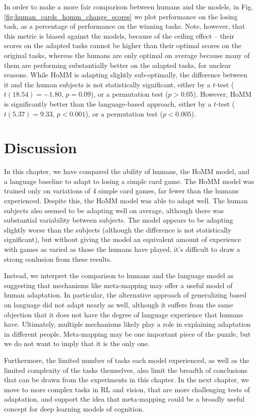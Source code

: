 In order to make a more fair comparison between humans and the models, in Fig. \ref{fig:human_cards_homm_change_scores} we plot performance on the losing task, as a percentage of performance on the winning tasks. Note, however, that this metric is biased against the models, because of the ceiling effect -- their scores on the adapted tasks cannot be higher than their optimal scores on the original tasks, whereas the humans are only optimal on average because many of them are performing substantially better on the adapted tasks, for unclear reasons. While HoMM is adapting slightly sub-optimally, the difference between it and the human subjects is not statistically significant, either by a \(t\)-test (\(t(18.54) = -1.80\), \(p = 0.09\)), or a permutation test (\(p > 0.05\)). However, HoMM is significantly better than the language-based approach, either by a   \(t\)-test (\(t(5.37) = 9.33\), \(p < 0.001\)), or a permutation test (\(p < 0.005\)). \par

\section{Discussion}

In this chapter, we have compared the ability of humans, the HoMM model, and a language baseline to adapt to losing a simple card game. The HoMM model was trained only on variations of 4 simple card games, far fewer than the humans experienced. Despite this, the HoMM model was able to adapt well. The human subjects also seemed to be adapting well on average, although there was substantial variability between subjects. The model appears to be adapting slightly worse than the subjects (although the difference is not statistically significant), but without giving the model an equivalent amount of experience with games as varied as those the humans have played, it's difficult to draw a strong conlusion from these results. \par
Instead, we interpret the comparison to humans and the language model as suggesting that mechanisms like meta-mapping may offer a useful model of human adaptation. In particular, the alternative approach of generalizing based on language did not adapt nearly as well, although it suffers from the same objection that it does not have the degree of language experience that humans have. Ultimately, multiple mechanisms likely play a role in explaining adaptation in different people. Meta-mapping may be one important piece of the puzzle, but we do not want to imply that it is the only one. \par 
Furthermore, the limited number of tasks each model experienced, as well as the limited complexity of the tasks themselves, also limit the breadth of conclusions that can be drawn from the experiments in this chapter. In the next chapter, we move to more complex tasks in RL and vision, that are more challenging tests of adaptation, and support the idea that meta-mapping could be a broadly useful concept for deep learning models of cognition. \par  
